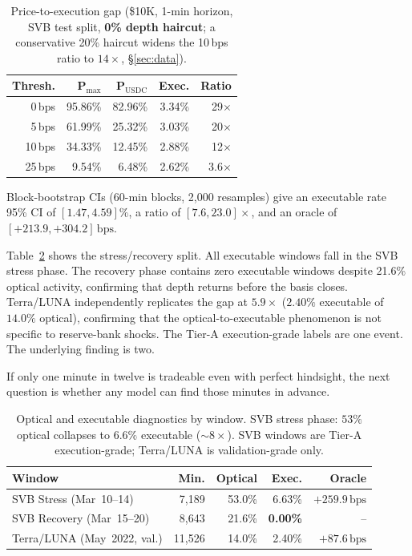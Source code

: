 \documentclass[sigconf,anonymous,natbib=false]{acmart}
\newcommand{\bps}{\,\text{bps}}
\begin{document}
\begin{table}[t]
\centering
\caption{Price-to-execution gap (\$10K, 1-min horizon, SVB test split,
  \textbf{0\% depth haircut}; a conservative 20\% haircut widens the 10\,bps
  ratio to $14\times$, \S\ref{sec:data}).}
\label{tab:gap}
\setlength{\tabcolsep}{3pt}
{\small
\begin{tabular}{rrrrr}
\toprule
\textbf{Thresh.} & \textbf{P$_{\max}$} & \textbf{P$_{\text{USDC}}$} &
\textbf{Exec.} & \textbf{Ratio}\\
\midrule
 0\,bps & 95.86\% & 82.96\% & 3.34\% & 29$\times$\\
 5\,bps & 61.99\% & 25.32\% & 3.03\% & 20$\times$\\
10\,bps & 34.33\% & 12.45\% & 2.88\% & 12$\times$\\
25\,bps &  9.54\% &  6.48\% & 2.62\% &  3.6$\times$\\
\bottomrule
\end{tabular}
}
\end{table}

Block-bootstrap CIs (60-min blocks, 2,000 resamples) give an executable
rate 95\% CI of $[1.47, 4.59]\%$, a ratio of $[7.6, 23.0]\times$, and an
oracle of $[+213.9, +304.2]\bps$.

Table~\ref{tab:tier_a_compare} shows the stress/recovery split.
All executable windows fall in the SVB stress phase. The recovery
phase contains zero executable windows despite 21.6\% optical
activity, confirming that depth returns before the basis closes.
Terra/LUNA independently replicates the gap at $5.9\times$ ($2.40\%$
executable of $14.0\%$ optical), confirming that the optical-to-executable
phenomenon is not specific to reserve-bank shocks. The Tier-A
execution-grade labels are one event. The underlying finding is two.

If only one minute in twelve is tradeable even with perfect hindsight,
the next question is whether any model can find those minutes in
advance.

\begin{table}[h]
\centering
\caption{Optical and executable diagnostics by window.
  SVB stress phase: $53\%$ optical collapses to $6.6\%$ executable (${\sim}8\times$).
  SVB windows are Tier-A execution-grade; Terra/LUNA is validation-grade only.}
\label{tab:tier_a_compare}
\setlength{\tabcolsep}{3pt}
{\small
\begin{tabular}{lrrrr}
\toprule
\textbf{Window} & \textbf{Min.} & \textbf{Optical} & \textbf{Exec.} & \textbf{Oracle}\\
\midrule
SVB Stress  (Mar~10--14)    & 7,189  & 53.0\% & 6.63\%           & $+259.9\bps$\\
SVB Recovery (Mar~15--20)   & 8,643  & 21.6\% & \textbf{0.00\%}  & --\\
Terra/LUNA (May~2022, val.) & 11,526 & 14.0\% & 2.40\%           & $+87.6\bps$\\
\bottomrule
\end{tabular}
}
\end{table}
\end{document}
